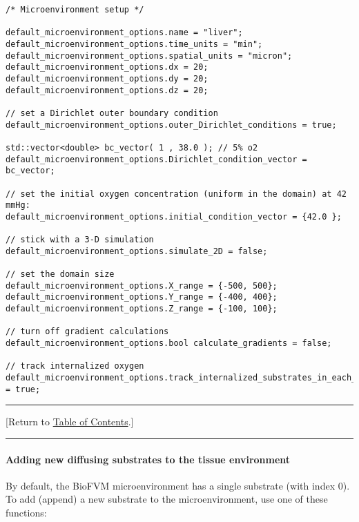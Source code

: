 \documentclass[12pt]{article}
\newcommand{\TOClink}{\begin{center}\hrule\vskip-5pt\phantom{.}\hfill[Return to \hyperlink{TOC}{Table of Contents}.]\hfill\phantom{.}\vskip3pt\hrule\end{center}}
\begin{document}
\begin{verbatim}
/* Microenvironment setup */ 

default_microenvironment_options.name = "liver"; 
default_microenvironment_options.time_units = "min"; 
default_microenvironment_options.spatial_units = "micron"; 
default_microenvironment_options.dx = 20; 
default_microenvironment_options.dy = 20;  
default_microenvironment_options.dz = 20; 
	
// set a Dirichlet outer boundary condition 
default_microenvironment_options.outer_Dirichlet_conditions = true;

std::vector<double> bc_vector( 1 , 38.0 ); // 5% o2  
default_microenvironment_options.Dirichlet_condition_vector = bc_vector; 

// set the initial oxygen concentration (uniform in the domain) at 42 mmHg: 
default_microenvironment_options.initial_condition_vector = {42.0 }; 
	
// stick with a 3-D simulation 
default_microenvironment_options.simulate_2D = false; 

// set the domain size 
default_microenvironment_options.X_range = {-500, 500};  
default_microenvironment_options.Y_range = {-400, 400}; 
default_microenvironment_options.Z_range = {-100, 100}; 
	
// turn off gradient calculations 
default_microenvironment_options.bool calculate_gradients = false; 

// track internalized oxygen 
default_microenvironment_options.track_internalized_substrates_in_each_agent = true; 
\end{verbatim}


\TOClink 
\paragraph{Adding new diffusing substrates to the tissue environment}
\label{sec:BioFVM_add_substrates}
By default, the BioFVM microenvironment has a single substrate (with index 0). 
To add (append) a new substrate to the microenvironment, use one of these functions: 
\end{document}
